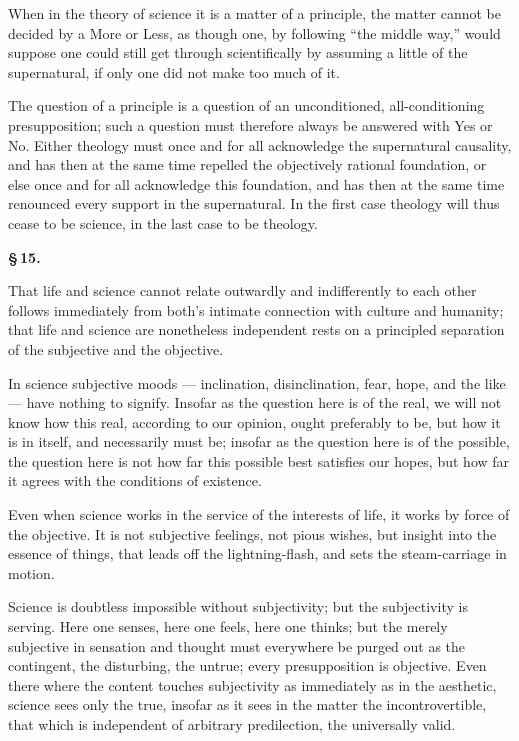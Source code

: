 \documentclass[12pt]{book}
\begin{document}
When in the theory of science it is a matter of a principle, the matter cannot be
decided by a More or Less, as though one, by following ``the middle way,'' would suppose
one could still get through scientifically by assuming a little of the supernatural, if
only one did not make too much of it.

The question of a principle is a question of an unconditioned, all-conditioning
presupposition; such a question must therefore always be answered with Yes or No. Either
theology must once and for all acknowledge the supernatural causality, and has then at
the same time repelled the objectively rational foundation, or else once and for all
acknowledge this foundation, and has then at the same time renounced every support in
the supernatural. In the first case theology will thus cease to be science, in the last
case to be theology.

\begin{center}{\bfseries \S\,15.}\end{center}

That life and science cannot relate outwardly and indifferently to each other follows
immediately from both's intimate connection with culture and humanity; that life and
science are nonetheless independent rests on a principled separation of the subjective
and the objective.

In science subjective moods — inclination, disinclination, fear, hope, and the like —
have nothing to signify. Insofar as the question here is of the real, we will not know
how this real, according to our opinion, ought preferably to be, but how it is in itself,
and necessarily must be; insofar as the question here is of the possible, the question
here is not how far this possible best satisfies our hopes, but how far it agrees with the
conditions of existence.

Even when science works in the service of the interests of life, it works by force of the
objective. It is not subjective feelings, not pious wishes, but insight into the
essence of things, that leads off the lightning-flash, and sets the steam-carriage in
motion.

Science is doubtless impossible without subjectivity; but the subjectivity is serving.
Here one senses, here one feels, here one thinks; but the merely subjective in sensation
and thought must everywhere be purged out as the contingent, the disturbing, the untrue;
every presupposition is objective. Even there where the content touches subjectivity as
immediately as in the aesthetic, science sees only the true, insofar as it sees in the
matter the incontrovertible, that which is independent of arbitrary predilection, the
universally valid.
\end{document}
